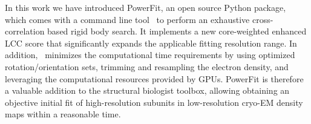 In this work we have introduced PowerFit, an open source Python package, which
comes with a command line tool \powerfit\ to perform an exhaustive
cross-correlation based rigid body search. It implements a new core-weighted
enhanced LCC score that significantly expands the applicable fitting resolution
range. In addition, \powerfit\ minimizes the computational time requirements by
using optimized rotation/orientation sets, trimming and resampling the electron
density, and leveraging the computational resources provided by GPUs. PowerFit
is therefore a valuable addition to the structural biologist toolbox, allowing
obtaining an objective initial fit of high-resolution subunits in
low-resolution cryo-EM density maps within a reasonable time.
